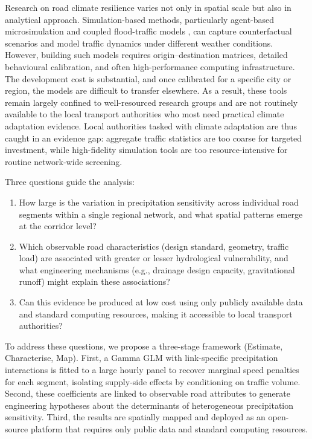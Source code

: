\documentclass[review,authoryear]{elsarticle}
\begin{document}
Research on road climate resilience varies not only in spatial scale but also in analytical approach. Simulation-based methods, particularly agent-based microsimulation \citep{huang2022overview,he2026flood} and coupled flood-traffic models \citep{pregnolato2017depth,farahmand2024integrating}, can capture counterfactual scenarios and model traffic dynamics under different weather conditions. However, building such models requires origin--destination matrices, detailed behavioural calibration, and often high-performance computing infrastructure. The development cost is substantial, and once calibrated for a specific city or region, the models are difficult to transfer elsewhere. As a result, these tools remain largely confined to well-resourced research groups and are not routinely available to the local transport authorities who most need practical climate adaptation evidence. Local authorities tasked with climate adaptation are thus caught in an evidence gap: aggregate traffic statistics are too coarse for targeted investment, while high-fidelity simulation tools are too resource-intensive for routine network-wide screening.

Three questions guide the analysis:
\begin{enumerate}[label=(\arabic*)]
    \item How large is the variation in precipitation sensitivity across individual road segments within a single regional network, and what spatial patterns emerge at the corridor level?
    \item Which observable road characteristics (design standard, geometry, traffic load) are associated with greater or lesser hydrological vulnerability, and what engineering mechanisms (e.g., drainage design capacity, gravitational runoff) might explain these associations?
    \item Can this evidence be produced at low cost using only publicly available data and standard computing resources, making it accessible to local transport authorities?
\end{enumerate}

To address these questions, we propose a three-stage framework (Estimate, Characterise, Map). First, a Gamma GLM with link-specific precipitation interactions is fitted to a large hourly panel to recover marginal speed penalties for each segment, isolating supply-side effects by conditioning on traffic volume. Second, these coefficients are linked to observable road attributes to generate engineering hypotheses about the determinants of heterogeneous precipitation sensitivity. Third, the results are spatially mapped and deployed as an open-source platform that requires only public data and standard computing resources.
\end{document}
